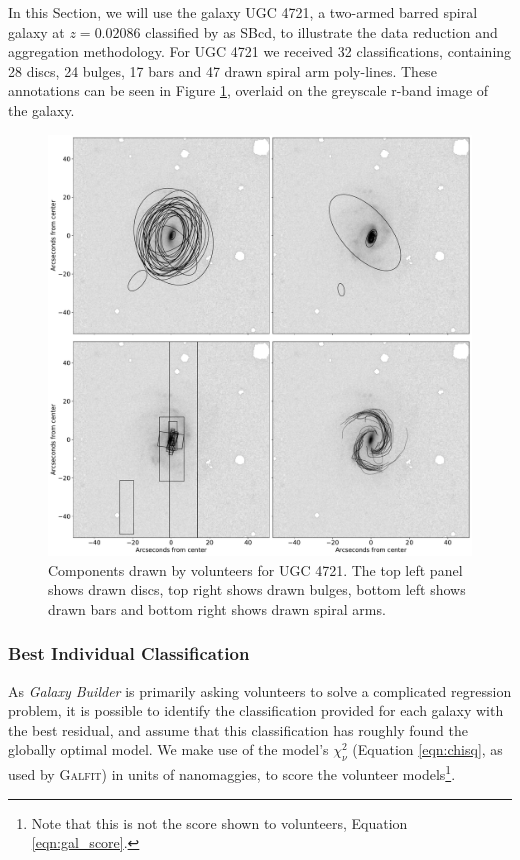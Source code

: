 \documentclass[../main.tex]{subfiles}
\begin{document}
In this Section, we will use the galaxy UGC 4721, a two-armed barred spiral galaxy at $z=0.02086$ classified by \citet{deVaucouleurs1991} as SBcd, to illustrate the data reduction and aggregation methodology. For UGC 4721 we received 32 classifications, containing 28 discs, 24 bulges, 17 bars and 47 drawn spiral arm poly-lines. These annotations can be seen in Figure \ref{fig:drawn_shapes}, overlaid on the greyscale r-band image of the galaxy.

\begin{figure}
  \includegraphics[width=17.3cm]{images__method/drawn_shapes.pdf}
  \caption{Components drawn by volunteers for UGC 4721. The top left panel shows drawn discs, top right shows drawn bulges, bottom left shows drawn bars and bottom right shows drawn spiral arms.}
  \label{fig:drawn_shapes}
\end{figure}

\subsubsection{Best Individual Classification}

As \textit{Galaxy Builder} is primarily asking volunteers to solve a complicated regression problem, it is possible to identify the classification provided for each galaxy with the best residual, and assume that this classification has roughly found the globally optimal model. We make use of the model's $\chi_\nu^2$ (Equation \ref{eqn:chisq}, as used by \textsc{Galfit}) in units of nanomaggies, to score the volunteer models\footnote{Note that this is not the score shown to volunteers, Equation \ref{eqn:gal_score}.}.
\end{document}
